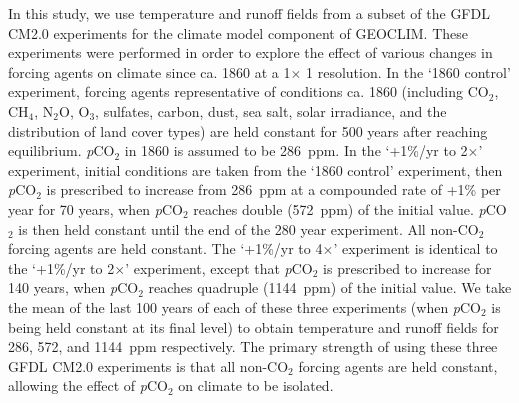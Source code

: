 \documentclass[11pt,letterpaper]{article}
\newcommand{\degrees}{\textdegree\xspace}
\newcommand{\pCOtwo}{\textit{p}CO$_{2}$\xspace}
\newcommand{\COtwo}{CO$_{2}$\xspace}
\begin{document}
In this study, we use temperature and runoff fields from a subset of the GFDL CM2.0 experiments \citep{Delworth2006a, Delworth2006b} for the climate model component of GEOCLIM. These experiments were performed in order to explore the effect of various changes in forcing agents on climate since ca. 1860 at a 1\degrees $\times$ 1\degrees resolution. In the `1860 control' experiment, forcing agents representative of conditions ca. 1860 (including \COtwo, CH$_{4}$, N$_{2}$O, O$_{3}$, sulfates, carbon, dust, sea salt, solar irradiance, and the distribution of land cover types) are held constant for 500 years after reaching equilibrium. \pCOtwo in 1860 is assumed to be 286~ppm. In the `+1\%/yr to 2$\times$' experiment, initial conditions are taken from the `1860 control' experiment, then \pCOtwo is prescribed to increase from 286~ppm at a compounded rate of +1\% per year for 70 years, when \pCOtwo reaches double (572~ppm) of the initial value. \pCOtwo is then held constant until the end of the 280 year experiment. All non-\COtwo forcing agents are held constant. The `+1\%/yr to 4$\times$' experiment is identical to the `+1\%/yr to 2$\times$' experiment, except that \pCOtwo is prescribed to increase for 140 years, when \pCOtwo reaches quadruple (1144~ppm) of the initial value. We take the mean of the last 100 years of each of these three experiments (when \pCOtwo is being held constant at its final level) to obtain temperature and runoff fields for 286, 572, and 1144~ppm respectively. The primary strength of using these three GFDL CM2.0 experiments is that all non-\COtwo forcing agents are held constant, allowing the effect of \pCOtwo on climate to be isolated.
\end{document}
